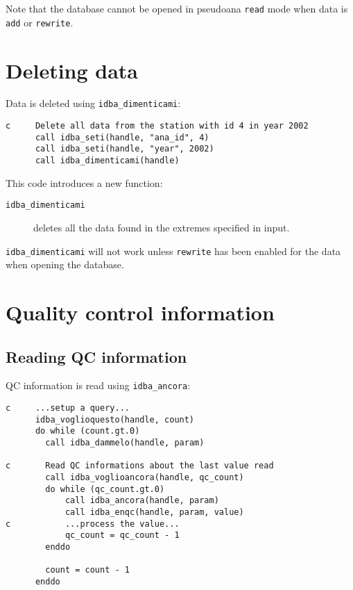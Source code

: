 \documentclass[draft,12pt,a4paper,twoside]{book}
\begin{document}
Note that the database cannot be opened in pseudoana {\tt read} mode when data
is {\tt add} or {\tt rewrite}.
  
\section{Deleting data}

Data is deleted using {\tt idba\_dimenticami}:
\label{fun-idba_dimenticami}

\begin{verbatim}
c     Delete all data from the station with id 4 in year 2002
      call idba_seti(handle, "ana_id", 4)
      call idba_seti(handle, "year", 2002)
      call idba_dimenticami(handle)
\end{verbatim}

This code introduces a new function:

\begin{description}
\item[{\tt idba\_dimenticami}]
  deletes all the data found in the extremes specified in input.
\end{description}

{\tt idba\_dimenticami} will not work unless {\tt rewrite} has been enabled for
the data when opening the database.

\section {Quality control information}

\subsection{Reading QC information}

QC information is read using {\tt idba\_ancora}:
\label{fun-idba_voglioancora}
\label{fun-idba_ancora}

\begin{verbatim}
c     ...setup a query...
      idba_voglioquesto(handle, count)
      do while (count.gt.0)
        call idba_dammelo(handle, param)

c       Read QC informations about the last value read
        call idba_voglioancora(handle, qc_count)
        do while (qc_count.gt.0)
            call idba_ancora(handle, param) 
            call idba_enqc(handle, param, value)
c           ...process the value...
            qc_count = qc_count - 1
        enddo

        count = count - 1
      enddo
\end{verbatim}
\end{document}
